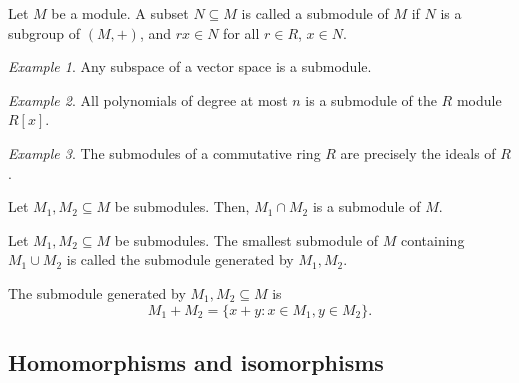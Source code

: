 \documentclass[11pt]{article}
\theoremstyle{definition}
\theoremstyle{remark}
\newtheorem*{example}{Example}
\numberwithin{equation}{section}
\begin{document}
    \begin{definition}
        Let $M$ be a module. A subset $N\subseteq M$ is called a submodule of $M$ if
        $N$ is a subgroup of $(M, +)$, and $rx \in N$ for all $r \in R$, $x \in N$.
    \end{definition}
    \begin{example}
        Any subspace of a vector space is a submodule.
    \end{example}
    \begin{example}
        All polynomials of degree at most $n$ is a submodule of the $R$ module
        $R[x]$.
    \end{example}
    \begin{example}
        The submodules of a commutative ring $R$ are precisely the ideals of $R$.
    \end{example}

    \begin{lemma}
        Let $M_1, M_2 \subseteq M$ be submodules. Then, $M_1 \cap M_2$ is a submodule
        of $M$.
    \end{lemma}
    \begin{definition}
        Let $M_1, M_2 \subseteq M$ be submodules. The smallest submodule of $M$
        containing $M_1 \cup M_2$ is called the submodule generated by $M_1, M_2$.
    \end{definition}
    \begin{lemma}
        The submodule generated by $M_1, M_2 \subseteq M$ is \[
            M_1 + M_2 = \{x + y : x \in M_1, y \in M_2\}.
        \] 
    \end{lemma}


    \subsection{Homomorphisms and isomorphisms}
    
\end{document}
